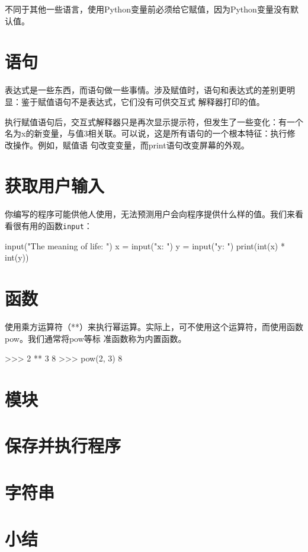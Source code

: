 不同于其他一些语言，使用Python变量前必须给它赋值，因为Python变量没有默认值。
\section{语句}
表达式是一些东西，而语句做一些事情。涉及赋值时，语句和表达式的差别更明显：鉴于赋值语句不是表达式，它们没有可供交互式
解释器打印的值。

执行赋值语句后，交互式解释器只是再次显示提示符，但发生了一些变化：有一个名为x的新变量，与值3相关联。可以说，这是所有语句的一个根本特征：执行修改操作。例如，赋值语
句改变变量，而print语句改变屏幕的外观。
\section{获取用户输入}
你编写的程序可能供他人使用，无法预测用户会向程序提供什么样的值。我们来看看很有用的函数\verb|input|：
\begin{pyc}
input("The meaning of life: ")
x = input("x: ")
y = input("y: ")
print(int(x) * int(y))
\end{pyc}
\section{函数}
使用乘方运算符（**）来执行幂运算。实际上，可不使用这个运算符，而使用函数pow。我们通常将pow等标
准函数称为内置函数。
\begin{pyc}
>>> 2 ** 3
8
>>> pow(2, 3)
8
\end{pyc}
\section{模块}
\section{保存并执行程序}
\section{字符串}
\section{小结}